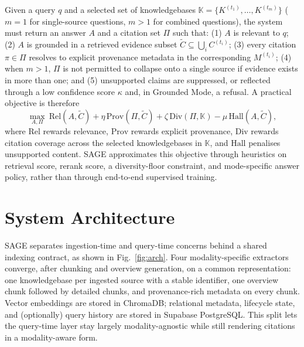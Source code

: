 \documentclass[conference]{IEEEtran}
\begin{document}
Given a query $q$ and a selected set of knowledgebases
$\mathbb{K} = \{K^{(t_1)}, \dots, K^{(t_m)}\}$ ($m=1$ for single-source
questions, $m>1$ for combined questions), the system must return an
answer $A$ and a citation set $\Pi$ such that: (1) $A$ is relevant to
$q$; (2) $A$ is grounded in a retrieved evidence subset
$\widetilde{C} \subseteq \bigcup_i C^{(t_i)}$; (3) every citation
$\pi \in \Pi$ resolves to explicit provenance metadata in the
corresponding $M^{(t_i)}$; (4) when $m > 1$, $\Pi$ is not permitted to
collapse onto a single source if evidence exists in more than one; and
(5) unsupported claims are suppressed, or reflected through a low
confidence score $\kappa$ and, in Grounded Mode, a refusal. A practical
objective is therefore
\begin{equation}
\max_{A,\Pi}\ \mathrm{Rel}(A,\widetilde{C}) + \eta\,\mathrm{Prov}(\Pi,\widetilde{C}) + \zeta\,\mathrm{Div}(\Pi,\mathbb{K}) - \mu\,\mathrm{Hall}(A,\widetilde{C}),
\end{equation}
where $\mathrm{Rel}$ rewards relevance, $\mathrm{Prov}$ rewards explicit
provenance, $\mathrm{Div}$ rewards citation coverage across the selected
knowledgebases in $\mathbb{K}$, and $\mathrm{Hall}$ penalises unsupported
content. SAGE approximates this objective through heuristics on
retrieval score, rerank score, a diversity-floor constraint, and
mode-specific answer policy, rather than through end-to-end supervised
training.

\section{System Architecture}

SAGE separates ingestion-time and query-time concerns behind a shared
indexing contract, as shown in Fig.~\ref{fig:arch}. Four
modality-specific extractors converge, after chunking and overview
generation, on a common representation: one knowledgebase per ingested
source with a stable identifier, one overview chunk followed by
detailed chunks, and provenance-rich metadata on every chunk. Vector
embeddings are stored in ChromaDB; relational metadata, lifecycle state,
and (optionally) query history are stored in Supabase PostgreSQL. This
split lets the query-time layer stay largely modality-agnostic while
still rendering citations in a modality-aware form.
\end{document}
